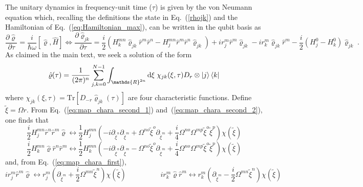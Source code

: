 \documentclass[%
reprint,
superscriptaddress,
nofootinbib,
 amsmath,amssymb,
prx,
floatfix,
]{revtex4-2}
\begin{document}
The unitary dynamics in frequency-unit time ($\tau$) is given by the von Neumann equation which, recalling the definitions the state in Eq.~(\ref{rhojk}) and the Hamiltonian of Eq.~(\ref{eq:Hamiltonian_max}), can be written in the qubit basis as
\begin{equation}
\label{eq:vonNeumann_master}
    \frac{\partial \hat{\varrho}}{\partial \tau} =  \frac{i}{\hbar \omega} \left[ \hat{\varrho} , \hat{H} \right] \Leftrightarrow  \frac{\partial \hat{\varrho}_{jk}}{\partial \tau} = \frac{i}{2} \left(  H_k^{mn} \hat{\varrho}_{jk} \hat{r}^m \hat{r}^n  - H_j^{mn} \hat{r}^m \hat{r}^n \hat{\varrho}_{jk}  \right) + i r_j^m \hat{r}^m \hat{\varrho}_{jk} - i r_k^m  \hat{\varrho}_{jk}  \hat{r}^m - \frac{i}{2} (H_j^0-H_k^0)\hat{\varrho}_{jk} \;.
\end{equation}
As claimed in the main text, we seek a solution of the form 
\begin{equation*}
    \hat{\varrho}(\tau) = \frac{1}{(2\pi)^n}\sum_{j, k  = 0}^{N-1}  \int_{\mathds{R}^{2n}} \text{d} \xi \; \chi_{jk} (\xi ,\tau)  D_{r} \otimes \ket{j} \bra{k}
\end{equation*}
where $\chi_{jk} (\xi ,\tau) = \text{Tr} [ D_{- r}  \hat{\varrho}_{jk} (\tau)] $ are four characteristic functions. Define $\tilde{\xi} = \Omega r$. From Eq.~(\ref{eq:map_chara_second_1}) and~(\ref{eq:map_chara_second_2}), one finds that 
\begin{equation*}
    \frac{i}{2} H^{mn}_j \hat{r}^n  \hat{r}^m  \hat{\varrho} \longleftrightarrow  \frac{1}{2} H^{mn}_j \left( - i \partial_{\tilde{\xi}^n} \partial_{\tilde{\xi}^m} + \Omega^{n o} \tilde{\xi}^o  \partial_{\tilde{\xi}^m} + \frac{i}{4} \Omega^{n o} \Omega^{m p} \tilde{\xi}^o \tilde{\xi}^p \right)  \chi (\tilde{\xi})
\end{equation*}
\begin{equation*}
    \frac{i}{2} H^{mn}_k \hat{\varrho}  \hat{r}^n  \hat{r}^m  \longleftrightarrow \frac{1}{2}  H^{mn}_k \left( - i \partial_{\tilde{\xi}^n} \partial_{\tilde{\xi}^m} -  \Omega^{n o} \tilde{\xi}^o  \partial_{\tilde{\xi}^m} + \frac{i}{4} \Omega^{n o} \Omega^{m p} \tilde{\xi}^o \tilde{\xi}^p \right)  \chi (\tilde{\xi})
\end{equation*}
and, from Eq.~(\ref{eq:map_chara_first}), 
\begin{equation*}
   i r_j^m \hat{r}^m \hat{\varrho}  \longleftrightarrow  r_j^m \left(  \partial_{\tilde{\xi}^m} + \frac{i}{2} \Omega^{mn} \tilde{\xi}^n \right) \chi (\tilde{\xi}) \hspace{2cm}  i  r^m_k \hat{\varrho} \hat{r}^m \longleftrightarrow  r^m_k \left(  \partial_{\tilde{\xi}^m} - \frac{i}{2} \Omega^{mn} \tilde{\xi}^n \right) \chi (\tilde{\xi})
\end{equation*}
\end{document}
